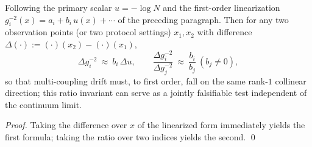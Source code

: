 \begin{corollary}\label{cor:gut-fiber-defect-single-latent-affine-collinearity}
Following the primary scalar \(u=-\log N\) and the first-order linearization \(g_i^{-2}(x)=a_i+b_i\,u(x)+\cdots\) of the preceding paragraph.
Then for any two observation points (or two protocol settings) \(x_1,x_2\) with difference \(\Delta(\cdot):=(\cdot)(x_2)-(\cdot)(x_1)\),
\[
\Delta g_i^{-2}\ \approx\ b_i\,\Delta u,
\qquad
\frac{\Delta g_i^{-2}}{\Delta g_j^{-2}}\ \approx\ \frac{b_i}{b_j}\ (b_j\neq 0),
\]
so that multi-coupling drift must, to first order, fall on the same rank-\(1\) collinear direction; this ratio invariant can serve as a jointly falsifiable test independent of the continuum limit.
\end{corollary}
\begin{proof}
Taking the difference over \(x\) of the linearized form immediately yields the first formula; taking the ratio over two indices yields the second. \qed
\end{proof}

